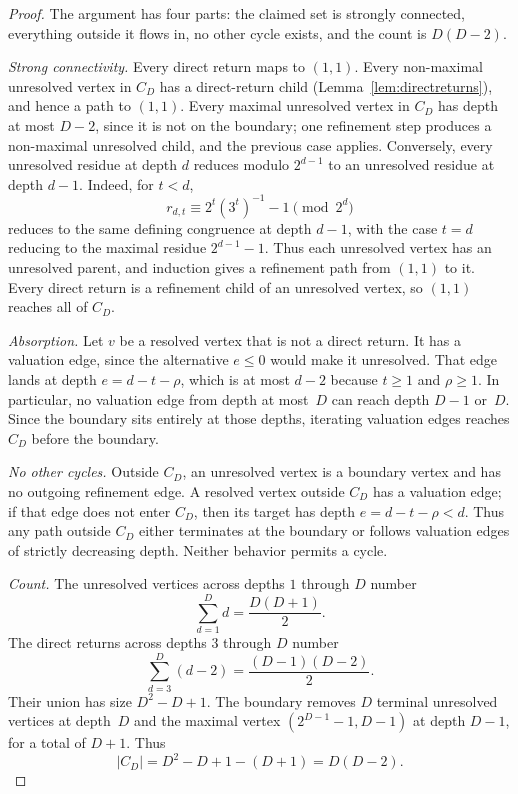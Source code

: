 \documentclass[11pt]{amsart}
\theoremstyle{definition}
\theoremstyle{remark}
\begin{document}
\begin{proof}
The argument has four parts: the claimed set is strongly connected,
everything outside it flows in, no other cycle exists, and the count is $D(D-2)$.

\emph{Strong connectivity.}
Every direct return maps to $(1,1)$.  Every non-maximal unresolved
vertex in $C_D$ has a direct-return child
(Lemma~\ref{lem:directreturns}), and hence a path to $(1,1)$.  Every
maximal unresolved vertex in $C_D$ has depth at most $D-2$, since it
is not on the boundary; one refinement step produces a non-maximal
unresolved child, and the previous case applies. Conversely, every unresolved residue 
at depth \(d\) reduces modulo \(2^{d-1}\) to an unresolved residue at depth \(d-1\). 
Indeed, for
\(t<d\),
\[
r_{d,t}\equiv 2^t(3^t)^{-1}-1 \pmod{2^d}
\]
reduces to the same defining congruence at depth \(d-1\), with the
case \(t=d\) reducing to the maximal residue \(2^{d-1}-1\).  Thus each
unresolved vertex has an unresolved parent, and induction gives a
refinement path from \((1,1)\) to it.  Every direct return is a
refinement child of an unresolved vertex, so \((1,1)\) reaches all of
\(C_D\).

\emph{Absorption.}
Let $v$ be a resolved vertex that is not a direct return.  It has a valuation edge, since the alternative $e\le0$ would make it unresolved.  That edge lands at depth $e=d-t-\rho$, which is at most $d-2$ because $t\ge1$ and $\rho\ge1$.  In particular, no valuation edge from depth at most~$D$ can reach depth $D-1$ or~$D$.  Since the boundary sits entirely at those depths, iterating valuation edges reaches $C_D$ before the boundary.

\emph{No other cycles.}
Outside \(C_D\), an unresolved vertex is a boundary vertex and has no
outgoing refinement edge.  A resolved vertex outside \(C_D\) has a
valuation edge; if that edge does not enter \(C_D\), then its target
has depth \(e=d-t-\rho<d\).  Thus any path outside \(C_D\) either
terminates at the boundary or follows valuation edges of strictly
decreasing depth.  Neither behavior permits a cycle.

\emph{Count.}
The unresolved vertices across depths $1$ through $D$ number
\[
\sum_{d=1}^{D}d=\frac{D(D+1)}{2}.
\]
The direct returns across depths $3$ through $D$ number
\[
\sum_{d=3}^{D}(d-2)=\frac{(D-1)(D-2)}{2}.
\]
Their union has size $D^2-D+1$.  The boundary removes $D$ terminal unresolved vertices at depth~$D$ and the maximal vertex $(2^{D-1}-1,D-1)$ at depth $D-1$, for a total of $D+1$.  Thus
\[
|C_D|=D^2-D+1-(D+1)=D(D-2).
\]
\end{proof}
\end{document}
